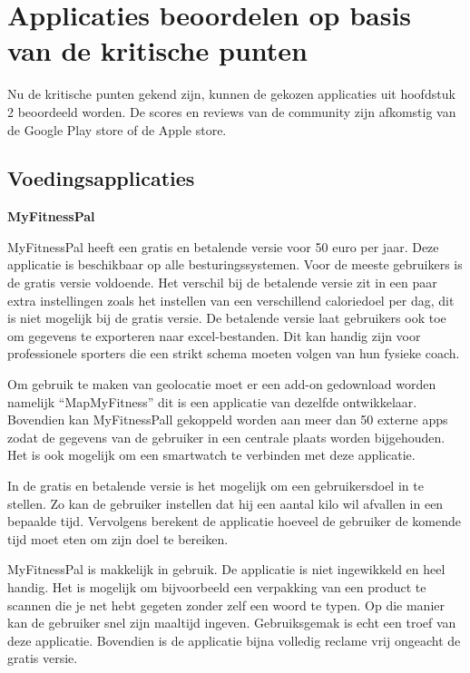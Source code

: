 \section{Applicaties beoordelen op basis van de kritische punten}
\label{sec:applicaties-beoordelen}

Nu de kritische punten gekend zijn, kunnen de gekozen applicaties uit hoofdstuk 2 beoordeeld worden. De scores en reviews van de community zijn afkomstig van de Google Play store of de Apple store. 

\subsection{Voedingsapplicaties}

\textbf{MyFitnessPal}

MyFitnessPal heeft een gratis en betalende versie voor 50 euro per jaar. Deze applicatie is beschikbaar op alle besturingssystemen. Voor de meeste gebruikers is de gratis versie voldoende. Het verschil bij de betalende versie zit in een paar extra instellingen zoals het instellen van een verschillend caloriedoel per dag, dit is niet mogelijk bij de gratis versie. De betalende versie laat gebruikers ook toe om gegevens te exporteren naar excel-bestanden. Dit kan handig zijn voor professionele sporters die een strikt schema moeten volgen van hun fysieke coach.

Om gebruik te maken van geolocatie moet er een add-on gedownload worden namelijk “MapMyFitness” dit is een applicatie van dezelfde ontwikkelaar. Bovendien kan MyFitnessPall gekoppeld worden aan meer dan 50 externe apps zodat de gegevens van de gebruiker in een centrale plaats worden bijgehouden. Het is ook mogelijk om een smartwatch te verbinden met deze applicatie.

In de gratis en betalende versie is het mogelijk om een gebruikersdoel in te stellen. Zo kan de gebruiker instellen dat hij een aantal kilo wil afvallen in een bepaalde tijd. Vervolgens berekent de applicatie hoeveel de gebruiker de komende tijd moet eten om zijn doel te bereiken. 

MyFitnessPal is makkelijk in gebruik. De applicatie is niet ingewikkeld en heel handig. Het is mogelijk om bijvoorbeeld een verpakking van een product te scannen die je net hebt gegeten zonder zelf een woord te typen. Op die manier kan de gebruiker snel zijn maaltijd ingeven. Gebruiksgemak is echt een troef van deze applicatie. Bovendien is de applicatie bijna volledig reclame vrij ongeacht de gratis versie. 


